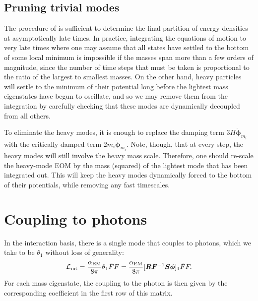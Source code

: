 \documentclass{article}
\begin{document}
\subsection{Pruning trivial modes}
The procedure of  is sufficient to determine the final partition of energy densities at asymptotically late times. In practice, integrating the equations of motion to very late times where one may assume that all states have settled to the bottom of some local minimum is impossible if the masses span more than a few orders of magnitude, since the number of time steps that must be taken is proportional to the ratio of the largest to smallest masses. On the other hand, heavy particles will settle to the minimum of their potential long before the lightest mass eigenstates have begun to oscillate, and so we may remove them from the integration by carefully checking that these modes are dynamically decoupled from all others.

To eliminate the heavy modes, it is enough to replace the damping term $3 H \dot{\bm \phi}_{m_i}$ with the critically damped term $2m_i\dot{\bm \phi}_{m_i}$. Note, though, that at every step, the heavy modes will still involve the heavy mass scale. Therefore, one should re-scale the heavy-mode EOM by the mass (squared) of the lightest mode that has been integrated out. This will keep the heavy modes dynamically forced to the bottom of their potentials, while removing any fast timescales.

\section{Coupling to photons}
In the interaction basis, there is a single mode that couples to photons, which we take to be $\theta_1$ without loss of generality:
\begin{align}
    {\cal L}_{\rm int} = \frac{\alpha_{\rm EM}}{8\pi}\theta_1\tilde F F =\frac{\alpha_{\rm EM}}{8\pi} [\bm R\bm F^{-1}\bm S \bm \phi]_1 \tilde F F.
\end{align}
For each mass eigenstate, the coupling to the photon is then given by the corresponding coefficient in the first row of this matrix.
\end{document}
